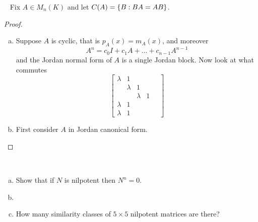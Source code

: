\documentclass{article}
\begin{document}
\begin{problem}{2} ~
  Fix $A \in M_n(K)$ and let $C(A) = \left\{ B : BA = AB \right\}$.
\end{problem}

\begin{proof} ~
  \begin{enumerate}[(a)]
    \item Suppose $A$ is cyclic, that is $p_A(x) = m_A(x)$, and moreover \[
      A^n = c_0I + c_1A + \hdots + c_{n-1}A^{n-1}
    \] and the Jordan normal form of $A$ is a single Jordan block.
    Now look at what commutes \[
      \begin{bmatrix}
        \lambda & 1 & \ & \ & \ \\
         \ & \lambda & 1 & \ & \ \\
         \ &  \ & \lambda & 1 & \ \\
        \lambda & 1 & \ & \ & \ \\
        \lambda & 1 & \ & \ & \
      \end{bmatrix}
    \]
    \item First consider $A$ in Jordan canonical form.
  \end{enumerate}
\end{proof}
\begin{problem}{3} ~
  \begin{enumerate}[(a)]
    \item Show that if $N$ is nilpotent then $N^n = 0$.
    \item
    \item How many similarity classes of $5 \times 5$ nilpotent matrices are there?
  \end{enumerate}
\end{problem}
\end{document}
